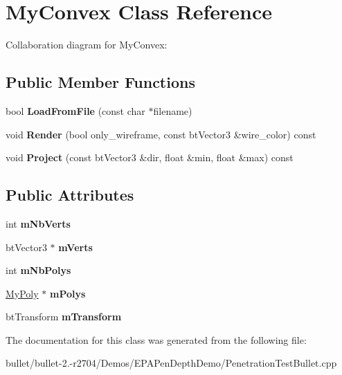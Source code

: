 \hypertarget{class_my_convex}{\section{My\+Convex Class Reference}
\label{class_my_convex}
}


Collaboration diagram for My\+Convex\+:
\subsection*{Public Member Functions}
\begin{DoxyCompactItemize}
\item 
\hypertarget{class_my_convex_ab903923f2734ed1404211a8868dd0c4b}{bool {\bfseries Load\+From\+File} (const char $\ast$filename)}\label{class_my_convex_ab903923f2734ed1404211a8868dd0c4b}

\item 
\hypertarget{class_my_convex_ae83334a33f6bf98b13f32413095789e6}{void {\bfseries Render} (bool only\+\_\+wireframe, const bt\+Vector3 \&wire\+\_\+color) const }\label{class_my_convex_ae83334a33f6bf98b13f32413095789e6}

\item 
\hypertarget{class_my_convex_aadbf82283492ba8cc938857b3eaf042c}{void {\bfseries Project} (const bt\+Vector3 \&dir, float \&min, float \&max) const }\label{class_my_convex_aadbf82283492ba8cc938857b3eaf042c}

\end{DoxyCompactItemize}
\subsection*{Public Attributes}
\begin{DoxyCompactItemize}
\item 
\hypertarget{class_my_convex_af764ecb7bcfdbb1798809fc2b08a2e56}{int {\bfseries m\+Nb\+Verts}}\label{class_my_convex_af764ecb7bcfdbb1798809fc2b08a2e56}

\item 
\hypertarget{class_my_convex_ad8c86a45a974cf0e2b98afcc2945a614}{bt\+Vector3 $\ast$ {\bfseries m\+Verts}}\label{class_my_convex_ad8c86a45a974cf0e2b98afcc2945a614}

\item 
\hypertarget{class_my_convex_a382bf32e663cfaabfbcf4b786f618fc5}{int {\bfseries m\+Nb\+Polys}}\label{class_my_convex_a382bf32e663cfaabfbcf4b786f618fc5}

\item 
\hypertarget{class_my_convex_a67e6ea343de39e6818e5b490ff3f0a8f}{\hyperlink{class_my_poly}{My\+Poly} $\ast$ {\bfseries m\+Polys}}\label{class_my_convex_a67e6ea343de39e6818e5b490ff3f0a8f}

\item 
\hypertarget{class_my_convex_a6e377707b3689fc2e6f8a8e0aeb79f3e}{bt\+Transform {\bfseries m\+Transform}}\label{class_my_convex_a6e377707b3689fc2e6f8a8e0aeb79f3e}

\end{DoxyCompactItemize}


The documentation for this class was generated from the following file\+:\begin{DoxyCompactItemize}
\item 
bullet/bullet-\/2.-\/r2704/\+Demos/\+E\+P\+A\+Pen\+Depth\+Demo/Penetration\+Test\+Bullet.\+cpp\end{DoxyCompactItemize}
